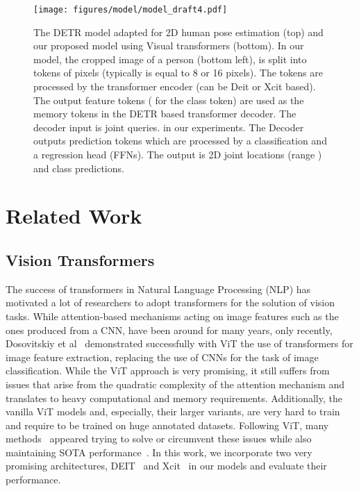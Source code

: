 \documentclass[runningheads]{llncs}
\begin{document}
\begin{figure*}[t]
  \begin{center}
  \texttt{[image: figures/model/model\_draft4.pdf]}
  \caption{
  \label{fig:model}
  The DETR model adapted for 2D human pose estimation (top) and 
  our proposed model using Visual transformers (bottom).
  In our model, the cropped image of a person (bottom left), is split into  tokens of  pixels
  (typically  is equal to 8 or 16 pixels). The tokens are processed by the transformer encoder 
  (can be Deit or Xcit based). The output feature tokens ( for the class token) are used
  as the memory tokens in the DETR based transformer decoder. The decoder input is 
   joint queries.  in our experiments. The Decoder outputs  prediction tokens which are 
  processed by a classification and a regression head (FFNs). The output is 2D joint locations (range ) and class predictions.}
  \end{center}
\end{figure*}

\section{Related Work}
\label{sec:relatedwork}

\subsection{Vision Transformers}
The success of transformers in Natural Language Processing (NLP) has motivated a lot of researchers to adopt transformers for the solution of vision tasks. While attention-based mechanisms acting on image features such as the ones produced from a CNN, have been around for many years, only recently, 
Dosovitskiy et al~\cite{dosovitskiy2020image} demonstrated successfully with ViT the  
use of transformers for image feature extraction, replacing the use of CNNs for 
the task of image classification.
While the ViT approach is very promising, it still suffers from issues that arise from the 
quadratic complexity of the attention mechanism and translates to heavy computational and memory requirements.
Additionally, the vanilla ViT models and, especially, their larger variants, are very hard to train and require to be trained on huge annotated datasets.
Following ViT, many methods~\cite{xiong2021nystr,wang2020linformer,mehta2021mobilevit,yuan2021tokens,zhang2021aggregating}
appeared trying to solve or circumvent these issues while also 
maintaining SOTA performance~\cite{el2021xcit,touvron2021training}. 
In this work, we incorporate two very promising architectures, 
DEIT~\cite{touvron2021training} and Xcit~\cite{el2021xcit} in our models 
and evaluate their performance.
\end{document}
